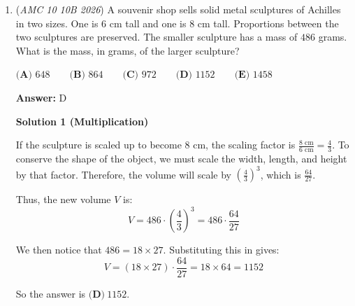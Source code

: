\begin{enumerate}
 



\textbf{Solution 6 (Long Division)}

Using long division, we can simplify the expression to 
 \[4 + \frac{2^{2026} - 2^{2023}}{2^{2024} - 2^{2023}}\]. 

 

 \[\frac{2^{2026} - 2^{2023}}{2^{2024} - 2^{2023}}\] 

 simplifies to $7$, because we can factor out  $2^{2023}$ from both the numerator and denominator:

 
 \[=\frac{2^{2023}(2^3-1)} {2^{2023}(2^1-1)}\]

 
Cancel the common factor:
 \[=\frac{8-1}{2-1} =\frac{7}{1}=7\]

 Substituting this into our original equation gives 
 \[4+\frac{2^{2026} - 2^{2023}}{2^{2024} - 2^{2023}}=4+7=\boxed{11}\]  ~littlefun

 edits by ~cowbunga (Added more clarity on the steps)

 More edits by ~littleduckysteve

 


	\item (\textit{AMC 10 10B 2026}) A souvenir shop sells solid metal sculptures of Achilles in two sizes. One is $6$ cm tall and one is $8$ cm tall. Proportions between the two sculptures are preserved. The smaller sculpture has a mass of $486$ grams. What is the mass, in grams, of the larger sculpture?


 $\textbf{(A) } 648 \qquad \textbf{(B) } 864 \qquad \textbf{(C) } 972 \qquad \textbf{(D) } 1152 \qquad \textbf{(E) } 1458$

 \textbf{Answer: }D



\textbf{Solution 1 (Multiplication)}

If the sculpture is scaled up to become $8\text{ cm}$, the scaling factor is $\frac{8\text{ cm}}{6\text{ cm}} = \frac{4}{3}$. To conserve the shape of the object, we must scale the width, length, and height by that factor. Therefore, the volume will scale by $\left(\frac{4}{3}\right)^3$, which is $\frac{64}{27}$. 

 Thus, the new volume $V$ is:
 \[V = 486 \cdot \left(\frac{4}{3}\right)^3 = 486 \cdot \frac{64}{27}\]

 We then notice that $486 = 18 \times 27$. Substituting this in gives:
 \[V = (18 \times 27) \cdot \frac{64}{27} = 18 \times 64 = 1152\]

 So the answer is $\boxed{\textbf{(D)} \ 1152}$.


\end{enumerate}
